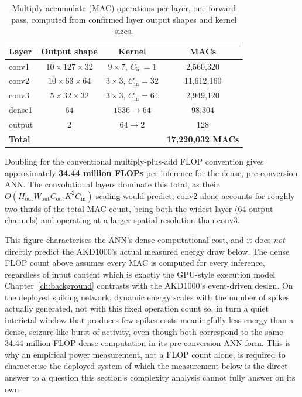 \begin{table}[H]
\centering
\caption{Multiply-accumulate (MAC) operations per layer, one forward pass, computed from confirmed layer output shapes and kernel sizes.}
\label{tab:flops}
\begin{tabular}{lccc}
\toprule
Layer & Output shape & Kernel & MACs \\
\midrule
conv1 & $10\times127\times32$ & $9\times7$, $C_{\text{in}}=1$ & 2,560,320 \\
\midrule
conv2 & $10\times63\times64$ & $3\times3$, $C_{\text{in}}=32$ & 11,612,160 \\
\midrule
conv3 & $5\times32\times32$ & $3\times3$, $C_{\text{in}}=64$ & 2,949,120 \\
\midrule
dense1 & $64$ & $1536 \rightarrow 64$ & 98,304 \\
\midrule
output & $2$ & $64 \rightarrow 2$ & 128 \\
\midrule
\textbf{Total} & & & \textbf{17,220,032 MACs} \\
\bottomrule
\end{tabular}
\end{table}

Doubling for the conventional multiply-plus-add FLOP convention gives approximately \textbf{34.44 million FLOPs} per inference for the dense, pre-conversion ANN. The convolutional layers dominate this total, as their $O(H_{\text{out}} W_{\text{out}} C_{\text{out}} K^2 C_{\text{in}})$ scaling would predict; conv2 alone accounts for roughly two-thirds of the total MAC count, being both the widest layer (64 output channels) and operating at a larger spatial resolution than conv3.

This figure characterises the ANN's dense computational cost, and it does \emph{not} directly predict the AKD1000's actual measured energy draw below. The dense FLOP count above assumes every MAC is computed for every inference, regardless of input content which is exactly the GPU-style execution model Chapter~\ref{ch:background} contrasts with the AKD1000's event-driven design. On the deployed spiking network, dynamic energy scales with the number of spikes actually generated, not with this fixed operation count so, in turn a quiet interictal window that produces few spikes costs meaningfully less energy than a dense, seizure-like burst of activity, even though both correspond to the same 34.44 million-FLOP dense computation in its pre-conversion ANN form. This is  why an empirical power measurement, not a FLOP count alone, is required to characterise the deployed system of which the measurement below is the direct answer to a question this section's complexity analysis cannot fully answer on its own.

